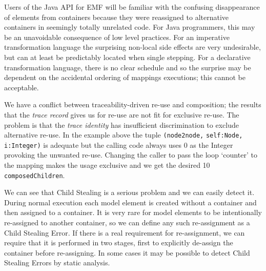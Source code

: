 \documentclass[runningheads,a4paper]{llncs}
\begin{document}
Users of the Java API for EMF\cite{emf} will be familiar with the confusing disappearance of elements from containers because they were reassigned to alternative containers in seemingly totally unrelated code. For Java programmers, this may be an unavoidable consequence of low level practices. For an imperative transformation language the surprising non-local side effects are very undesirable, but can at least be predictably located when single stepping. For a declarative transformation language, there is no clear schedule and so the surprise may be dependent on the accidental ordering of mappings executions; this cannot be acceptable.

We have a conflict between traceability-driven re-use and composition; the results that the \emph{trace record} gives us for re-use are not fit for exclusive re-use. The problem is that the \emph{trace identity} has insufficient discrimination to exclude alternative re-use. In the example above the tuple \verb|(node2node,| \verb|self:Node,| \verb|i:Integer)| is adequate but the calling code always uses 0 as the Integer provoking the unwanted re-use. Changing the caller to pass the loop `counter' to the mapping makes the usage exclusive and we get the desired 10 \verb|composedChildren|.

We can see that Child Stealing is a serious problem and we can easily detect it. During normal execution each model element is created without a container and then assigned to a container. It is very rare for model elements to be intentionally re-assigned to another container, so we can define any such re-assignment as a Child Stealing Error. If there is a real requirement for re-assignment, we can require that  it is performed in two stages, first to explicitly de-assign the container before re-assigning. In some cases it may be possible to detect Child Stealing Errors by static analysis.

\end{document}
